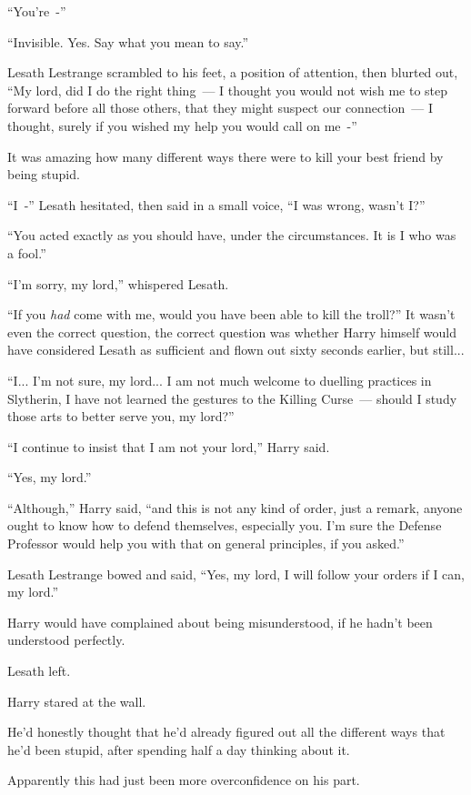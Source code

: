``You're~-''

``Invisible. Yes. Say what you mean to say.''

Lesath Lestrange scrambled to his feet, a position of attention, then blurted out, ``My lord, did I do the right thing~--- I thought you would not wish me to step forward before all those others, that they might suspect our connection~--- I thought, surely if you wished my help you would call on me~-''

It was amazing how many different ways there were to kill your best friend by being stupid.

``I~-'' Lesath hesitated, then said in a small voice, ``I was wrong, wasn't I?''

``You acted exactly as you should have, under the circumstances. It is I who was a fool.''

``I'm sorry, my lord,'' whispered Lesath.

``If you \emph{had} come with me, would you have been able to kill the troll?'' It wasn't even the correct question, the correct question was whether Harry himself would have considered Lesath as sufficient and flown out sixty seconds earlier, but still...

``I... I'm not sure, my lord... I am not much welcome to duelling practices in Slytherin, I have not learned the gestures to the Killing Curse~--- should I study those arts to better serve you, my lord?''

``I continue to insist that I am not your lord,'' Harry said.

``Yes, my lord.''

``Although,'' Harry said, ``and this is not any kind of order, just a remark, anyone ought to know how to defend themselves, especially you. I'm sure the Defense Professor would help you with that on general principles, if you asked.''

Lesath Lestrange bowed and said, ``Yes, my lord, I will follow your orders if I can, my lord.''

Harry would have complained about being misunderstood, if he hadn't been understood perfectly.

Lesath left.

Harry stared at the wall.

He'd honestly thought that he'd already figured out all the different ways that he'd been stupid, after spending half a day thinking about it.

Apparently this had just been more overconfidence on his part.

